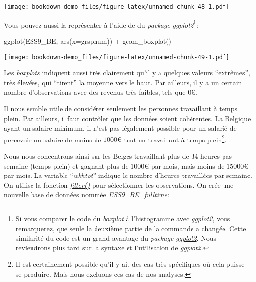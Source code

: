 \documentclass[
]{book}
\newenvironment{Shaded}{\begin{snugshade}}{\end{snugshade}}
\newcommand{\AttributeTok}[1]{\textcolor[rgb]{0.77,0.63,0.00}{#1}}
\newcommand{\FunctionTok}[1]{\textcolor[rgb]{0.00,0.00,0.00}{#1}}
\newcommand{\NormalTok}[1]{#1}
\newcommand{\SpecialCharTok}[1]{\textcolor[rgb]{0.00,0.00,0.00}{#1}}
\begin{document}
\texttt{[image: bookdown-demo\_files/figure-latex/unnamed-chunk-48-1.pdf]}

Vous pouvez aussi la représenter à l'aide de du \emph{package} \href{https://ggplot2.tidyverse.org/}{\emph{ggplot2}}\footnote{Si vous comparer le code du \emph{boxplot} à l'histogramme avec \href{https://ggplot2.tidyverse.org/}{\emph{ggplot2}}, vous remarquerez, que seule la deuxième partie de la commande a changée. Cette similarité du code est un grand avantage du \emph{package} \href{https://ggplot2.tidyverse.org/}{\emph{ggplot2}}. Nous reviendrons plus tard sur la syntaxe et l'utilisation de \href{https://ggplot2.tidyverse.org/}{\emph{ggplot2}}.}:

\begin{Shaded}
\begin{Highlighting}[]
\FunctionTok{ggplot}\NormalTok{(ESS9\_BE, }\FunctionTok{aes}\NormalTok{(}\AttributeTok{x=}\NormalTok{grspnum)) }\SpecialCharTok{+}
  \FunctionTok{geom\_boxplot}\NormalTok{()}
\end{Highlighting}
\end{Shaded}

\texttt{[image: bookdown-demo\_files/figure-latex/unnamed-chunk-49-1.pdf]}

Les \emph{boxplots} indiquent aussi très clairement qu'il y a quelques valeurs ``extrêmes'', très élevées, qui ``tirent'' la moyenne vers le haut. Par ailleurs, il y a un certain nombre d'observations avec des revenus très faibles, tels que \(0€\).

Il nous semble utile de considérer seulement les personnes travaillant à temps plein. Par ailleurs, il faut contrôler que les données soient cohérentes. La Belgique ayant un salaire minimum, il n'est pas légalement possible pour un salarié de percevoir un salaire de moins de \(1000€\) tout en travaillant à temps plein\footnote{Il est certainement possible qu'il y ait des cas très spécifiques où cela puisse se produire. Mais nous excluons ces cas de nos analyses.}.

Nous nous concentrons ainsi sur les Belges travaillant plus de 34 heures pas semaine (temps plein) et gagnant plus de \(1000€\) par mois, mais moins de \(15000€\) par mois. La variable ``\emph{wkhtot}'' indique le nombre d'heures travaillées par semaine. On utilise la fonction \href{https://dplyr.tidyverse.org/reference/filter.html}{\emph{filter()}} pour sélectionner les observations. On crée une nouvelle base de données nommée \emph{ESS9\_BE\_fulltime}:
\end{document}
